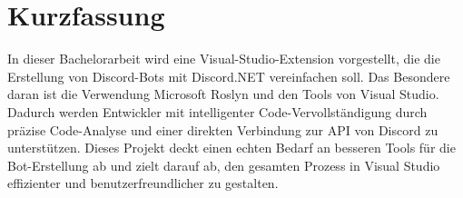 \section{Kurzfassung}
In dieser Bachelorarbeit wird eine Visual-Studio-Extension vorgestellt, die die Erstellung von Discord-Bots mit Discord.NET vereinfachen soll. Das Besondere daran ist die Verwendung Microsoft Roslyn und den Tools von Visual Studio. Dadurch werden Entwickler mit intelligenter Code-Vervollständigung durch präzise Code-Analyse und einer direkten Verbindung zur API von Discord zu unterstützen. Dieses Projekt deckt einen echten Bedarf an besseren Tools für die Bot-Erstellung ab und zielt darauf ab, den gesamten Prozess in Visual Studio effizienter und benutzerfreundlicher zu gestalten.
